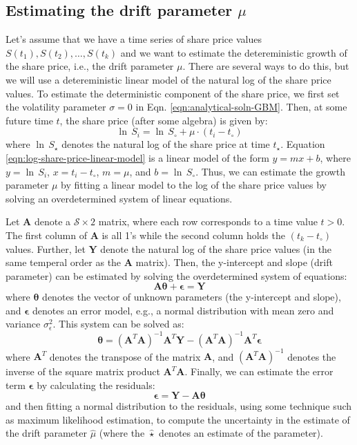 \documentclass[11pt]{article}
\theoremstyle{definition}
\begin{document}
\subsection{Estimating the drift parameter $\mu$}
Let's assume that we have a time series of share price values $S(t_{1}), S(t_{2}), \dots, S(t_{k})$ and we want to estimate the detereministic growth of the share price, i.e., the drift parameter $\mu$.
There are several ways to do this, but we will use a detereministic linear model of the natural log of the share price values.
To estimate the deterministic component of the share price, we first set the volatility parameter $\sigma = 0$ in Eqn. \ref{eqn:analytical-soln-GBM}.
Then, at some future time $t$, the share price (after some algebra) is given by:
\begin{equation}\label{eqn:log-share-price-linear-model}
\ln\,S_{i} = \ln\,S_{\circ} + \mu\cdot\left(t_{i}-t_{\circ}\right)
\end{equation}
where $\ln\,S_{\star}$ denotes the natural log of the share price at time $t_{\star}$.
Equation \ref{eqn:log-share-price-linear-model} is a linear model of the form $y = mx + b$, where $y = \ln\,S_{i}$, $x = t_{i}-t_{\circ}$, $m = \mu$, and $b = \ln\,S_{\circ}$.
Thus, we can estimate the growth parameter $\mu$ by fitting a linear model to the log of the share price values by solving an overdetermined system of linear equations.

Let $\mathbf{A}$ denote a $\mathcal{S}\times{2}$ matrix, where each row corresponds to a time value $t>0$. 
The first column of $\mathbf{A}$ is all 1's while the second column holds the $(t_{k}-t_{\circ})$ values. 
Further, let $\mathbf{Y}$ denote the natural log of the share price values (in the same temperal order as the $\mathbf{A}$ matrix). 
Then, the y-intercept and slope (drift parameter) can be estimated by solving the overdetermined system of equations:
\begin{equation*}
\mathbf{A}\mathbf{\theta} + \mathbf{\epsilon} = \mathbf{Y}
\end{equation*}
where $\mathbf{\theta}$ denotes the vector of unknown parameters (the y-intercept and slope), and $\mathbf{\epsilon}$ denotes an error model, e.g., a normal distribution with mean zero and variance $\sigma_{\epsilon}^{2}$.
This system can be solved as:
\begin{equation*}
\mathbf{\theta} = (\mathbf{A}^{T}\mathbf{A})^{-1}\mathbf{A}^{T}\mathbf{Y} - (\mathbf{A}^{T}\mathbf{A})^{-1}\mathbf{A}^{T}\mathbf{\epsilon}
\end{equation*}
where $\mathbf{A}^{T}$ denotes the transpose of the matrix $\mathbf{A}$, and $(\mathbf{A}^{T}\mathbf{A})^{-1}$ denotes the inverse of the square matrix product $\mathbf{A}^{T}\mathbf{A}$. 
Finally, we can estimate the error term $\mathbf{\epsilon}$ by calculating the residuals:
\begin{equation*}
\mathbf{\epsilon} = \mathbf{Y} - \mathbf{A}\mathbf{\theta}
\end{equation*}
and then fitting a normal distribution to the residuals, using some technique such as maximum likelihood estimation, to compute the uncertainty in the estimate of the drift parameter $\hat{\mu}$ 
(where the $\hat{\star}$ denotes an estimate of the parameter).
\end{document}
